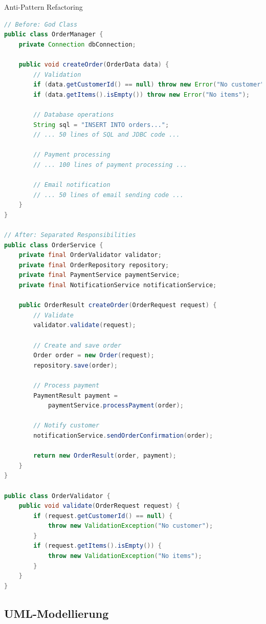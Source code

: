 \begin{example2}{Anti-Pattern Refactoring}
\begin{lstlisting}[language=Java, style=basesmol]
// Before: God Class
public class OrderManager {
    private Connection dbConnection;
    
    public void createOrder(OrderData data) {
        // Validation
        if (data.getCustomerId() == null) throw new Error("No customer");
        if (data.getItems().isEmpty()) throw new Error("No items");
        
        // Database operations
        String sql = "INSERT INTO orders...";
        // ... 50 lines of SQL and JDBC code ...
        
        // Payment processing
        // ... 100 lines of payment processing ...
        
        // Email notification
        // ... 50 lines of email sending code ...
    }
}

// After: Separated Responsibilities
public class OrderService {
    private final OrderValidator validator;
    private final OrderRepository repository;
    private final PaymentService paymentService;
    private final NotificationService notificationService;
    
    public OrderResult createOrder(OrderRequest request) {
        // Validate
        validator.validate(request);
        
        // Create and save order
        Order order = new Order(request);
        repository.save(order);
        
        // Process payment
        PaymentResult payment = 
            paymentService.processPayment(order);
            
        // Notify customer
        notificationService.sendOrderConfirmation(order);
        
        return new OrderResult(order, payment);
    }
}

public class OrderValidator {
    public void validate(OrderRequest request) {
        if (request.getCustomerId() == null) {
            throw new ValidationException("No customer");
        }
        if (request.getItems().isEmpty()) {
            throw new ValidationException("No items");
        }
    }
}
\end{lstlisting}
\end{example2}

\subsection{UML-Modellierung}

